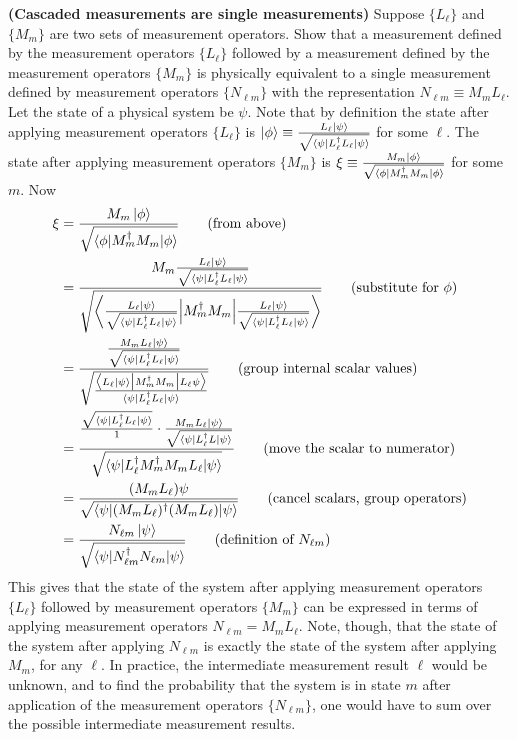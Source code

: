  \textbf{(Cascaded measurements are  single measurements)} Suppose $\{L_\ell\}$ and $\{M_m\}$ are two sets of measurement operators.  Show that a measurement defined by the measurement operators $\{L_\ell\}$ followed by a measurement defined by the measurement operators $\{M_m\}$ is physically equivalent to a single measurement defined by measurement operators $\{N_{\ell m}\}$ with the representation $N_{\ell m} \equiv M_mL_\ell$.
\Soln  Let the state of a physical system be $\psi$.  Note that by definition the state after applying measurement operators $\{L_\ell\}$ is $\ket{\phi} \equiv \frac{L_\ell\ket{\psi}}{\sqrt{\braket{\psi|L_\ell^\dagger L_\ell|\psi}}}$ for some $\ell$.  The state after applying measurement operators $\{M_m\}$ is $\xi \equiv \frac{M_m\ket{\phi}}{\sqrt{\braket{\phi|M_m^\dagger M_m|\phi}}}$ for some $m$.  Now
\begin{align*}
    \xi &= \frac{M_m\ket{\phi}}{\sqrt{\braket{\phi|M_m^\dagger M_m|\phi}}} \tag{from above} \\
    &= \frac{M_m \frac{L_\ell \ket{\psi}}{\sqrt{{\braket{\psi|L_\ell^\dagger L_\ell|\psi}}}}}{\sqrt{\left\langle\frac{L_\ell\ket{\psi}}{\sqrt{\braket{\psi|L_\ell^\dagger L_\ell|\psi}}}\Big\lvert M_m^\dagger M_m\Big\rvert \frac{L_\ell\ket{\psi}}{\sqrt{\braket{\psi|L_\ell^\dagger L_\ell|\psi}}}\right\rangle}} \tag{substitute for $\phi$} \\
    &= \frac{\frac{M_mL_\ell\ket{\psi}}{\sqrt{\braket{\psi|L_\ell^\dagger L_\ell|\psi}}}}{\sqrt{\frac{\big\langle L_\ell\ket{\psi}\big\lvert M_m^\dagger M_m\big\rvert L_\ell\psi\big\rangle}{\braket{\psi|L_\ell^\dagger L_\ell|\psi}}}} \tag{group internal scalar values} \\
    &=\frac{\frac{\sqrt{\braket{\psi|L_\ell^\dagger L_\ell|\psi}}}{1}\cdot\frac{M_mL_\ell\ket{\psi}}{\sqrt{\braket{\psi|L_\ell^\dagger L|\psi}}}}{\sqrt{\braket{\psi|L_\ell^\dagger M_m^\dagger M_m L_\ell | \psi}}} \tag{move the scalar to numerator}\\
    &=\frac{(M_mL_\ell)\psi}{\sqrt{\braket{\psi| (M_mL_\ell)^\dagger(M_mL_\ell)|\psi}}} \tag{cancel scalars, group operators}\\
    &= \frac{N_{\ell m}\ket{\psi}}{\sqrt{\braket{\psi|N_{\ell m}^\dagger N_{\ell m}|\psi}}} \tag{definition of $N_{\ell m}$}
\end{align*}
This gives that the state of the system after applying measurement operators $\{L_\ell\}$ followed by measurement operators $\{M_m\}$ can be expressed in terms of applying measurement operators $N_{\ell m} = M_mL_\ell$.  Note, though, that the state of the system after applying $N_{\ell m}$ is exactly the state of the system after applying $M_m$, for any $\ell$.  In practice, the intermediate measurement result $\ell$ would be unknown, and to find the probability that the system is in state $m$ after application of the measurement operators $\{N_{\ell m}\}$, one would have to sum over the possible intermediate measurement results.  


